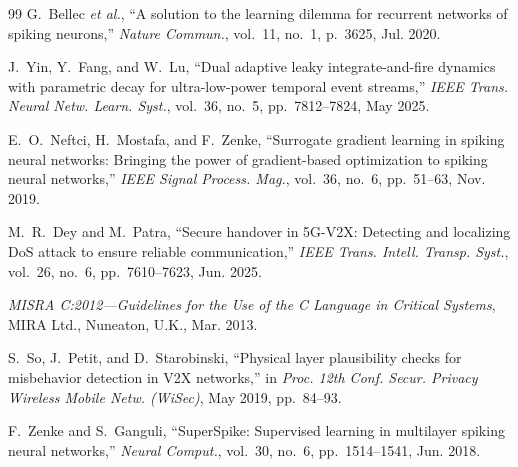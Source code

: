 \documentclass[journal]{IEEEtran}
\begin{document}
\begin{thebibliography}{99}
G.~Bellec \emph{et al.}, ``A solution to the learning dilemma for recurrent networks of spiking neurons,'' \emph{Nature Commun.}, vol.~11, no.~1, p.~3625, Jul. 2020.

J.~Yin, Y.~Fang, and W.~Lu, ``Dual adaptive leaky integrate-and-fire dynamics with parametric decay for ultra-low-power temporal event streams,'' \emph{IEEE Trans. Neural Netw. Learn. Syst.}, vol.~36, no.~5, pp.~7812--7824, May 2025.

E.~O.~Neftci, H.~Mostafa, and F.~Zenke, ``Surrogate gradient learning in spiking neural networks: Bringing the power of gradient-based optimization to spiking neural networks,'' \emph{IEEE Signal Process. Mag.}, vol.~36, no.~6, pp.~51--63, Nov. 2019.

M.~R.~Dey and M.~Patra, ``Secure handover in 5G-V2X: Detecting and localizing DoS attack to ensure reliable communication,'' \emph{IEEE Trans. Intell. Transp. Syst.}, vol.~26, no.~6, pp.~7610--7623, Jun. 2025.

\emph{MISRA C:2012---Guidelines for the Use of the C Language in Critical Systems}, MIRA Ltd., Nuneaton, U.K., Mar. 2013.

S.~So, J.~Petit, and D.~Starobinski, ``Physical layer plausibility checks for misbehavior detection in V2X networks,'' in \emph{Proc. 12th Conf. Secur. Privacy Wireless Mobile Netw. (WiSec)}, May 2019, pp.~84--93.

F.~Zenke and S.~Ganguli, ``SuperSpike: Supervised learning in multilayer spiking neural networks,'' \emph{Neural Comput.}, vol.~30, no.~6, pp.~1514--1541, Jun. 2018.

\end{thebibliography}
\end{document}
